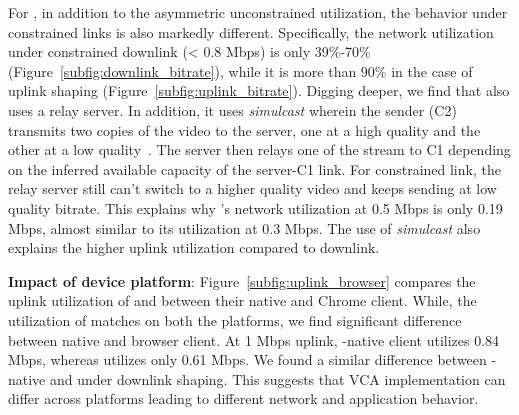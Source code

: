 For \meet, in addition to the asymmetric unconstrained utilization, the behavior under constrained links is also markedly different. Specifically, the network utilization under constrained downlink (< 0.8 Mbps) is only 39\%-70\% (Figure~\ref{subfig:downlink_bitrate}), while it is more than $90\%$ in the case of uplink shaping (Figure~\ref{subfig:uplink_bitrate}). Digging deeper, we find that \meet also uses a relay server. In addition, it uses \textit{simulcast} wherein the sender (C2) transmits two copies of the video to the server, one at a high quality and the other at a low quality~\cite{nistico2020comparative}. The server then relays one of the stream to C1 depending on the inferred available capacity of the server-C1 link. For constrained link, the relay server still can't switch to a higher quality video and keeps sending at low quality bitrate. This explains why \meet's network utilization at 0.5 Mbps is only 0.19 Mbps, almost similar to its utilization at 0.3 Mbps.  The use of \textit{simulcast} also explains the higher uplink utilization compared to downlink. %



\textbf{Impact of device platform}: Figure~\ref{subfig:uplink_browser} compares the uplink utilization of \zoom and \teams between their native and Chrome client. While, the utilization of \zoom matches on both the platforms, we find significant difference between \teams native and browser client. At 1 Mbps uplink, \teams-native client utilizes 0.84 Mbps, whereas \teamsbrowser utilizes only 0.61 Mbps. We found a similar difference between \teams-native and \teamsbrowser under downlink shaping. This suggests that VCA implementation can differ across platforms leading to different network and application behavior. 


